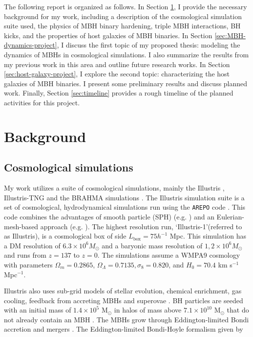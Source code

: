 \documentclass[11pt, letterpaper]{article}
\newcommand{\msun}{M$_{\odot}$}
\newcommand{\kms}{km s$^{-1}$}
\begin{document}
The following report is organized as follows. In Section \ref{sec:background}, I provide the necessary background for my work, including a description of the cosmological simulation suite used, the physics of MBH binary hardening, triple MBH interactions, BH kicks, and the properties of host galaxies of MBH binaries. In Section \ref{sec:MBH-dynamics-project}, I discuss the first topic of my proposed thesis: modeling the dynamics of MBHs in cosmological simulations. I also summarize the results from my previous work in this area and outline future research works. In Section \ref{sec:host-galaxy-project}, I explore the second topic: characterizing the host galaxies of MBH binaries. I present some preliminary results and discuss planned work. Finally, Section \ref{sec:timeline} provides a rough timeline of the planned activities for this project.


\section{Background}
\label{sec:background}

\subsection{Cosmological simulations}
\label{sec:cosmo-sim}

My work utilizes a suite of cosmological simulations, mainly the Illustris \citep{Vogelsberg_2014a,2015Illustris,Nelson_2015}, Illustris-TNG \citep{nelson2021illustristngsimulationspublicdata} and the BRAHMA simulations \citep{bhowmick2024introducingbrahmasimulationsuite,bhowmick2024growthhighredshiftsupermassive}. The Illustris simulation suite is a set of cosmological, hydrodynamical simulations run using the {\tt AREPO}  code \citep{Springel_2010}. This code combines the advantages of smooth particle (SPH) (e.g. \citep{Gingold_1977}) and an Eulerian-mesh-based approach (e.g. \citep{Berger_1989}). The highest resolution run, `Illustris-1'(referred to as Illustris), is a cosmological box of side $L_{\text{box}} = 75 h^{-1}$ Mpc. This simulation has a DM resolution of $6.3 \times 10^6 M_{\odot}$ and a baryonic mass resolution of $1,2 \times 10^6 M_{\odot}$ and runs from $z=137$ to $z=0$. The simulations assume a WMPA9 cosmology \citep{Hinshaw_2013} with parameters $\Omega_m = 0.2865$, $\Omega_{\Lambda} = 0.7135, \sigma_{8} = 0.820$, and $H_{0} = 70.4$ \kms Mpc$^{-1}$. 

Illustris also uses sub-grid models of stellar evolution, chemical enrichment, gas cooling, feedback from accreting MBHs and superovae \citep{Vogelsberger_2013,Torrey_2014}. BH particles are seeded with an initial mass of $1.4 \times 10^{5}$ \msun{} in halos of mass above $7.1 \times 10^{10}$ \msun{} that do not already contain an MBH \citep{2015Illustris}. The MBHs grow through Eddington-limited Bondi accretion and mergers \citep{Springel_2005,DiMatteo_2005}. The Eddington-limited Bondi-Hoyle formalism given by
\end{document}
